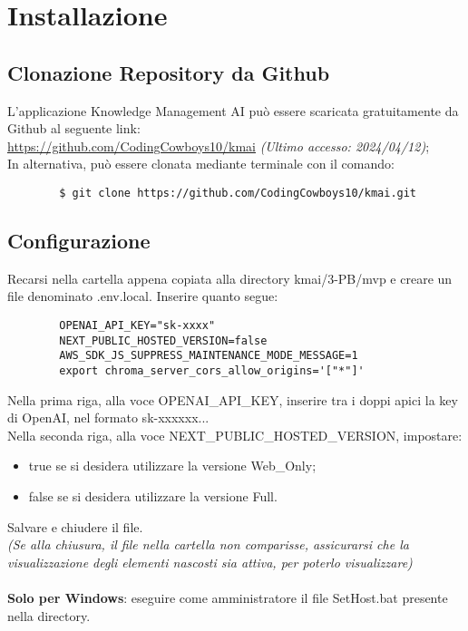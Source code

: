 \chapter{Installazione} \label{cap:Inst}
\section{Clonazione Repository da Github}
L'applicazione Knowledge Management AI può essere scaricata gratuitamente da Github al seguente link: \\ \url{https://github.com/CodingCowboys10/kmai} \textit{(Ultimo accesso: 2024/04/12)}; \\
In alternativa, può essere clonata mediante terminale con il comando:
    \begin{lstlisting}
        $ git clone https://github.com/CodingCowboys10/kmai.git
    \end{lstlisting}

\section{Configurazione}
Recarsi nella cartella appena copiata alla  directory kmai/3-PB/mvp e creare un file denominato .env.local. Inserire quanto segue:
    \begin{lstlisting}
        OPENAI_API_KEY="sk-xxxx"
        NEXT_PUBLIC_HOSTED_VERSION=false
        AWS_SDK_JS_SUPPRESS_MAINTENANCE_MODE_MESSAGE=1
        export chroma_server_cors_allow_origins='["*"]'
    \end{lstlisting}
Nella prima riga, alla voce OPENAI\_API\_KEY, inserire tra i doppi apici la key di OpenAI, nel formato sk-xxxxxx...\\
Nella seconda riga, alla voce NEXT\_PUBLIC\_HOSTED\_VERSION, impostare:
\vspace{-0.3cm}
\begin{itemize}[itemsep=-2pt]
    \item true se si desidera utilizzare la versione Web\_Only;
    \item false se si desidera utilizzare la versione Full.
\end{itemize}
\vspace{-0.3cm}
Salvare e chiudere il file.\\
\textit{(Se alla chiusura, il file nella cartella non comparisse, assicurarsi che la visualizzazione degli elementi nascosti sia attiva, per poterlo visualizzare)}\\ \\
\textbf{Solo per Windows}: eseguire come amministratore il file SetHost.bat presente nella directory.

